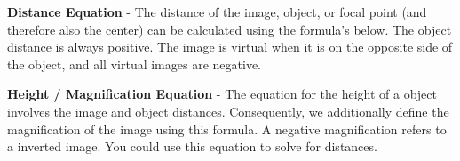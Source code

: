 \documentclass{article}
\begin{document}
\begin{minipage}{0.32\textwidth}
{}
\end{minipage}
\vspace{10pt}

\textbf{Distance Equation} - The distance of the image, object, or focal point (and therefore also the center) can be calculated using the formula's below. The object distance is always positive. The image is virtual when it is on the opposite side of the object, and all virtual images are negative.
\begin{center}
\end{center}
\vspace{10pt}

\textbf{Height / Magnification Equation} - The equation for the height of a object involves the image and object distances. Consequently, we additionally define the magnification of the image using this formula. A negative magnification refers to a inverted image. You could use this equation to solve for distances.
\begin{center}
\end{center}
\end{document}
